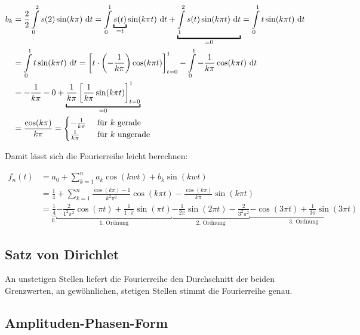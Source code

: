 \begin{align*}
	b_k &= \frac{2}{2} \int\limits^2_0 s(2) \sin(k \pi) \dt 
		= \int\limits^1_0 \underbracket{s(t)}_{=t} \sin(k \pi t) \dt + \underbracket{\int\limits^2_1 s(t) \sin(k \pi t) \dt}_{=0} = \int\limits^1_0 t \sin(k \pi t) \dt \\
		&= \int\limits^1_0{t \sin(k \pi t)\dt} = \left[ t \cdot \left(-\frac{1}{k \pi}\right) \cos(k \pi t) \right]^1_{t=0} - \int\limits^1_0{ - \frac{1}{k \pi} \cos(k \pi t)\dt} \\
		&= -\frac{1}{k \pi} - 0 + \underbracket{\frac{1}{k \pi} \left[ \frac{1}{k \pi} \sin(k \pi t) \right]^1_{t=0}}_{\text{=0}} \\
		&= \frac{\cos(k \pi)}{k \pi} = \begin{cases}
			-\frac{1}{k \pi} & \text{ für } k \text{ gerade} \\
			\frac{1}{k \pi} & \text{ für } k \text{ ungerade}
		\end{cases}
\end{align*}

Damit lässt sich die Fourierreihe leicht berechnen:

\begin{align*}
f_n(t) &= a_0 + \sum^n_{k=1}{a_k \cos(k w t) + b_k \sin(k w t)} \\
	   &= \frac{1}{4} + \sum^n_{k=1}{ \frac{\cos(k \pi) -1}{k^2 \pi^2} \cos(k \pi t) - \frac{\cos(k \pi)}{k \pi} \sin(k \pi t)} \\
	   &= \underbracket{\frac{1}{4}}_{\text{0.}}
	    \underbracket{-\frac{2}{1^2 \pi^2} \cos(\pi t) + \frac{1}{1 \cdot \pi} \sin(\pi t)}_{\text{1. Ordnung}}
	    \underbracket{-\frac{1}{2 \pi} \sin(2 \pi t) -\frac{2}{3^2 \pi^2}}_{\text{2. Ordnung}}
	    \underbracket{-\cos(3 \pi t) + \frac{1}{3 \pi} \sin(3 \pi t)}_{\text{3. Ordnung}}
\end{align*} %

\subsection{Satz von Dirichlet}

An unstetigen Stellen liefert die Fourierreihe den Durchschnitt der beiden Grenzwerten, an gewöhnlichen, stetigen Stellen stimmt die Fourierreihe genau.

\subsection{Amplituden-Phasen-Form}

